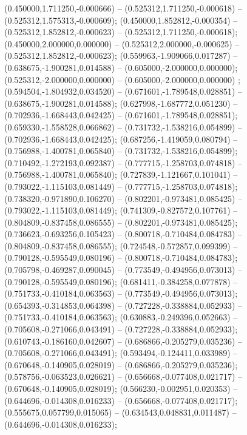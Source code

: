  (0.450000,1.711250,-0.000666) -- (0.525312,1.711250,-0.000618) -- (0.525312,1.575313,-0.000609);
 (0.450000,1.852812,-0.000354) -- (0.525312,1.852812,-0.000623) -- (0.525312,1.711250,-0.000618);
 (0.450000,2.000000,0.000000) -- (0.525312,2.000000,-0.000625) -- (0.525312,1.852812,-0.000623);
 (0.559963,-1.909066,0.017287) -- (0.638675,-1.900281,0.014588) -- (0.605000,-2.000000,0.000000);
 (0.525312,-2.000000,0.000000) -- (0.605000,-2.000000,0.000000) ;
 (0.594504,-1.804932,0.034520) -- (0.671601,-1.789548,0.028851) -- (0.638675,-1.900281,0.014588);
 (0.627998,-1.687772,0.051230) -- (0.702936,-1.668443,0.042425) -- (0.671601,-1.789548,0.028851);
 (0.659330,-1.558528,0.066862) -- (0.731732,-1.538216,0.054899) -- (0.702936,-1.668443,0.042425);
 (0.687256,-1.419059,0.080794) -- (0.756988,-1.400781,0.065840) -- (0.731732,-1.538216,0.054899);
 (0.710492,-1.272193,0.092387) -- (0.777715,-1.258703,0.074818) -- (0.756988,-1.400781,0.065840);
 (0.727839,-1.121667,0.101041) -- (0.793022,-1.115103,0.081449) -- (0.777715,-1.258703,0.074818);
 (0.738320,-0.971890,0.106270) -- (0.802201,-0.973481,0.085425) -- (0.793022,-1.115103,0.081449);
 (0.741309,-0.827572,0.107761) -- (0.804809,-0.837458,0.086555) -- (0.802201,-0.973481,0.085425);
 (0.736623,-0.693256,0.105423) -- (0.800718,-0.710484,0.084783) -- (0.804809,-0.837458,0.086555);
 (0.724548,-0.572857,0.099399) -- (0.790128,-0.595549,0.080196) -- (0.800718,-0.710484,0.084783);
 (0.705798,-0.469287,0.090045) -- (0.773549,-0.494956,0.073013) -- (0.790128,-0.595549,0.080196);
 (0.681411,-0.384258,0.077878) -- (0.751733,-0.410184,0.063563) -- (0.773549,-0.494956,0.073013);
 (0.654393,-0.314853,0.064398) -- (0.727228,-0.338884,0.052933) -- (0.751733,-0.410184,0.063563);
 (0.630883,-0.249396,0.052663) -- (0.705608,-0.271066,0.043491) -- (0.727228,-0.338884,0.052933);
 (0.610743,-0.186160,0.042607) -- (0.686866,-0.205279,0.035236) -- (0.705608,-0.271066,0.043491);
 (0.593494,-0.124411,0.033989) -- (0.670648,-0.140905,0.028019) -- (0.686866,-0.205279,0.035236);
 (0.578756,-0.063523,0.026621) -- (0.656668,-0.077408,0.021717) -- (0.670648,-0.140905,0.028019);
 (0.566230,-0.002951,0.020353) -- (0.644696,-0.014308,0.016233) -- (0.656668,-0.077408,0.021717);
 (0.555675,0.057799,0.015065) -- (0.634543,0.048831,0.011487) -- (0.644696,-0.014308,0.016233);
